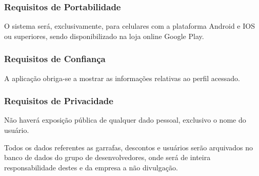 \begin{apendicesenv}
\subsubsection{Requisitos de Portabilidade}
O sistema será, exclusivamente, para celulares com a plataforma Android e IOS ou superiores, sendo disponibilizado na loja online Google Play.

\subsubsection{Requisitos de Confiança}
A aplicação obriga-se a mostrar as informações relativas ao perfil acessado.

\subsubsection{Requisitos de Privacidade}
Não haverá exposição pública de qualquer dado pessoal, exclusivo o nome do usuário.

Todos os dados referentes as garrafas, descontos e usuários serão arquivados no banco de dados do grupo de desenvolvedores, onde será de inteira responsabilidade destes e da empresa a não divulgação.
\end{apendicesenv}
